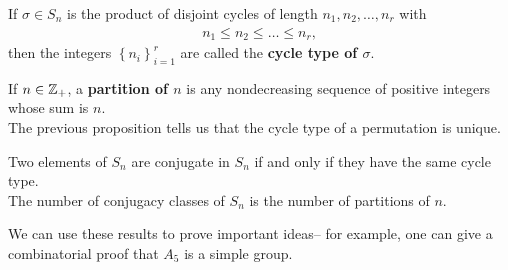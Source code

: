 \documentclass{memoir}
\begin{document}
\begin{defn}
	If \(\sigma  \in S_n\) is the product of disjoint cycles of length \(n_1,n_2,\ldots,n_r\) with
	\begin{align*}
		n_1\leq n_2\leq \ldots\leq n_r,
	\end{align*}
	then the integers \(\left\{ n_i \right\}_{i=1}^{r}\) are called the \textbf{cycle type of \(\sigma \)}.
\end{defn}
	If \(n \in \mathbb{Z}_+\), a \textbf{partition of \(n\)} is any nondecreasing sequence of positive integers whose sum is \(n\).\\

	The previous proposition tells us that the cycle type of a permutation is unique.
	\begin{prop}
		Two elements of \(S_n\) are conjugate in \(S_n\) if and only if they have the same cycle type.\\

		The number of conjugacy classes of \(S_n\) is the number of partitions of \(n\).
	\end{prop}

	We can use these results to prove important ideas-- for example, one can give a combinatorial proof that \(A_5\) is a simple group.
\end{document}
